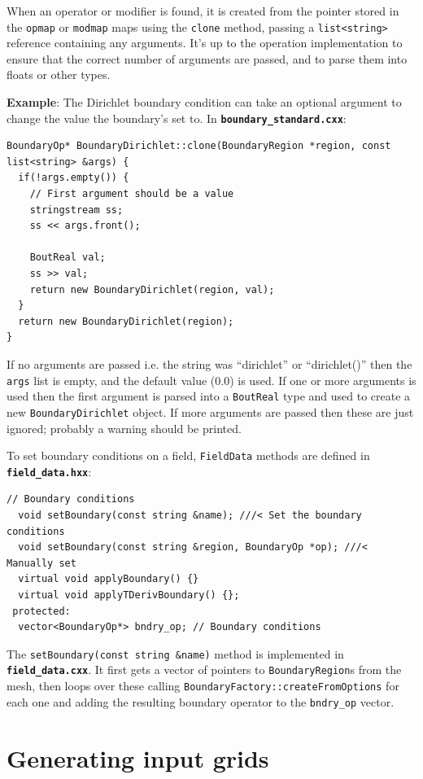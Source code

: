\documentclass[12pt]{article}
\newcommand{\code}[1]{\texttt{#1}}
\newcommand{\file}[1]{\texttt{\bf #1}}
\begin{document}
When an operator or modifier is found, it is created from the pointer
stored in the \code{opmap} or \code{modmap} maps using the
\code{clone} method, passing
a \code{list<string>} reference containing any arguments. It's up
to the operation implementation to ensure that the correct number of
arguments are passed, and to parse them into floats or other types.

{\bf Example}: The Dirichlet boundary condition can take an optional
argument to change the value the boundary's set to. In \file{boundary\_standard.cxx}:
\begin{lstlisting}[firstnumber=13]
BoundaryOp* BoundaryDirichlet::clone(BoundaryRegion *region, const list<string> &args) {
  if(!args.empty()) {
    // First argument should be a value
    stringstream ss;
    ss << args.front();

    BoutReal val;
    ss >> val;
    return new BoundaryDirichlet(region, val);
  }
  return new BoundaryDirichlet(region);
}
\end{lstlisting}
If no arguments are passed i.e. the string was ``dirichlet'' or ``dirichlet()''
then the \code{args} list is empty, and the default value (0.0) is used.
If one or more arguments is used then the first argument is parsed into a
\code{BoutReal} type and used to create a new \code{BoundaryDirichlet} object.
If more arguments are passed then these are just ignored; probably a warning
should be printed.

To set boundary conditions on a field, \code{FieldData} methods are
defined in \file{field\_data.hxx}: 
\begin{lstlisting}
// Boundary conditions
  void setBoundary(const string &name); ///< Set the boundary conditions
  void setBoundary(const string &region, BoundaryOp *op); ///< Manually set
  virtual void applyBoundary() {}
  virtual void applyTDerivBoundary() {};
 protected:
  vector<BoundaryOp*> bndry_op; // Boundary conditions
\end{lstlisting}
The \code{setBoundary(const string \&name)} method is implemented in
\file{field\_data.cxx}. It first gets a vector of pointers to
\code{BoundaryRegion}s from the mesh, then loops over these calling
\code{BoundaryFactory::createFromOptions} for each one and adding the resulting
boundary operator to the \code{bndry\_op} vector.

\section{Generating input grids}
\label{sec:gridgen}
\end{document}

